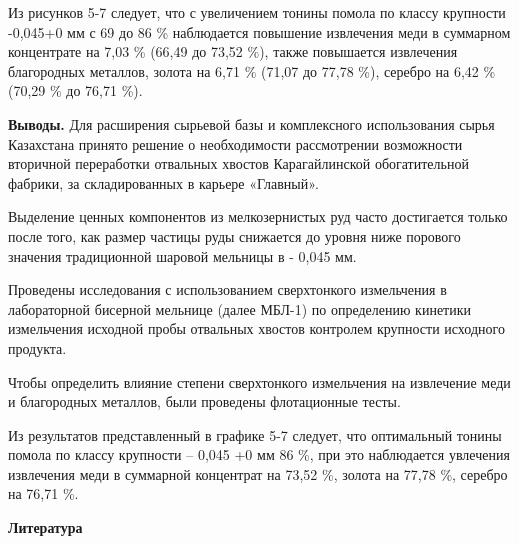 \begin{multicols}{2}
Из рисунков 5-7 следует, что с увеличением тонины помола по классу
крупности -0,045+0 мм с 69 до 86 \% наблюдается повышение извлечения
меди в суммарном концентрате на 7,03 \% (66,49 до 73,52 \%), также
повышается извлечения благородных металлов, золота на 6,71 \% (71,07 до
77,78 \%), серебро на 6,42 \% (70,29 \% до 76,71 \%).

{\bfseries Выводы.} Для расширения сырьевой базы и комплексного
использования сырья Казахстана принято решение о необходимости
рассмотрении возможности вторичной переработки отвальных хвостов
Карагайлинской обогатительной фабрики, за складированных в карьере
«Главный».

Выделение ценных компонентов из мелкозернистых руд часто достигается
только после того, как размер частицы руды снижается до уровня ниже
порового значения традиционной шаровой мельницы в - 0,045 мм.

Проведены исследования с использованием сверхтонкого измельчения в
лабораторной бисерной мельнице (далее МБЛ-1) по определению кинетики
измельчения исходной пробы отвальных хвостов контролем крупности
исходного продукта.

Чтобы определить влияние степени сверхтонкого измельчения на извлечение
меди и благородных металлов, были проведены флотационные тесты.

Из результатов представленный в графике 5-7 следует, что оптимальный
тонины помола по классу крупности -- 0,045 +0 мм 86 \%, при это
наблюдается увлечения извлечения меди в суммарной концентрат на 73,52
\%, золота на 77,78 \%, серебро на 76,71 \%.
\end{multicols}

\begin{center}
{\bfseries Литература}
\end{center}

